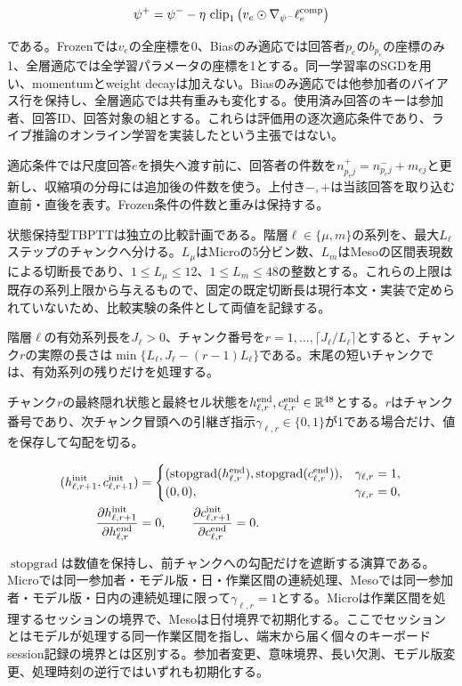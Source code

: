 \[
\psi^{+}
=\psi^{-}-\eta\,\operatorname{clip}_1
\left(v_e\odot\nabla_{\psi^{-}}\ell_e^{\rm comp}\right)
\]

である。Frozenでは\(v_e\)の全座標を0、Biasのみ適応では回答者\(p_e\)の\(b_{p_e}\)の座標のみ1、全層適応では全学習パラメータの座標を1とする。同一学習率のSGDを用い、momentumとweight decayは加えない。Biasのみ適応では他参加者のバイアス行を保持し、全層適応では共有重みも変化する。使用済み回答のキーは参加者、回答ID、回答対象の組とする。これらは評価用の逐次適応条件であり、ライブ推論のオンライン学習を実装したという主張ではない。

適応条件では尺度回答\(e\)を損失へ渡す前に、回答者の件数を\(n_{p_ej}^{+}=n_{p_ej}^{-}+m_{ej}\)と更新し、収縮項の分母には追加後の件数を使う。上付き\(-,+\)は当該回答を取り込む直前・直後を表す。Frozen条件の件数と重みは保持する。

状態保持型TBPTTは独立の比較計画である\autocite{williams1990tbptt}。階層\(\ell\in\{\mu,m\}\)の系列を、最大\(L_\ell\)ステップのチャンクへ分ける。\(L_\mu\)はMicroの5分ビン数、\(L_m\)はMesoの区間表現数による切断長であり、\(1\le L_\mu\le12\)、\(1\le L_m\le48\)の整数とする。これらの上限は既存の系列上限から与えるもので、固定の既定切断長は現行本文・実装で定められていないため、比較実験の条件として両値を記録する。

階層\(\ell\)の有効系列長を\(J_\ell>0\)、チャンク番号を\(r=1,\ldots,\lceil J_\ell/L_\ell\rceil\)とすると、チャンク\(r\)の実際の長さは\(\min\{L_\ell,J_\ell-(r-1)L_\ell\}\)である。末尾の短いチャンクでは、有効系列の残りだけを処理する。

チャンク\(r\)の最終隠れ状態と最終セル状態を\(h_{\ell,r}^{\rm end},c_{\ell,r}^{\rm end}\in\mathbb R^{48}\)とする。\(r\)はチャンク番号であり、次チャンク冒頭への引継ぎ指示\(\gamma_{\ell,r}\in\{0,1\}\)が1である場合だけ、値を保存して勾配を切る。

\[
\begin{aligned}
(h_{\ell,r+1}^{\rm init},c_{\ell,r+1}^{\rm init})
&=
\begin{cases}
(\operatorname{stopgrad}(h_{\ell,r}^{\rm end}),
\operatorname{stopgrad}(c_{\ell,r}^{\rm end})),
&\gamma_{\ell,r}=1,\\
(0,0),&\gamma_{\ell,r}=0,
\end{cases}\\
\frac{\partial h_{\ell,r+1}^{\rm init}}
{\partial h_{\ell,r}^{\rm end}}&=0,\qquad
\frac{\partial c_{\ell,r+1}^{\rm init}}
{\partial c_{\ell,r}^{\rm end}}=0.
\end{aligned}
\]

\(\operatorname{stopgrad}\)は数値を保持し、前チャンクへの勾配だけを遮断する演算である。Microでは同一参加者・モデル版・日・作業区間の連続処理、Mesoでは同一参加者・モデル版・日内の連続処理に限って\(\gamma_{\ell,r}=1\)とする。Microは作業区間を処理するセッションの境界で、Mesoは日付境界で初期化する。ここでセッションとはモデルが処理する同一作業区間を指し、端末から届く個々のキーボードsession記録の境界とは区別する。参加者変更、意味境界、長い欠測、モデル版変更、処理時刻の逆行ではいずれも初期化する。

